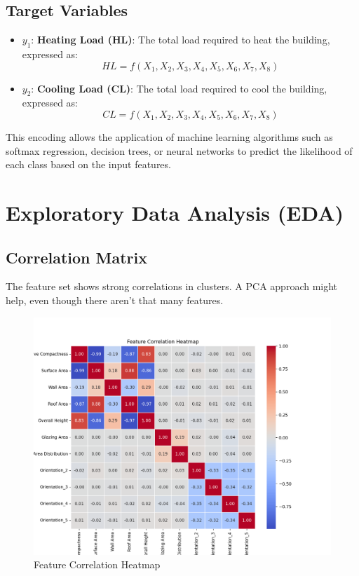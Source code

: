 \documentclass{article}
\begin{document}
\subsection{Target Variables}
\begin{itemize}
    \item \( y_1 \): \textbf{Heating Load (HL)}: The total load required to heat the building, expressed as:
    \[
    HL = f(X_1, X_2, X_3, X_4, X_5, X_6, X_7, X_8)
    \]

    \item \( y_2 \): \textbf{Cooling Load (CL)}: The total load required to cool the building, expressed as:
    \[
    CL = f(X_1, X_2, X_3, X_4, X_5, X_6, X_7, X_8)
    \]
\end{itemize}

This encoding allows the application of machine learning algorithms such as softmax regression, decision trees, or neural networks to predict the likelihood of each class based on the input features.

\section{Exploratory Data Analysis (EDA)}

\subsection{Correlation Matrix}
The feature set shows strong correlations in clusters. A PCA approach might help, even though there aren't that many features.

\begin{figure}[H]  
    \centering
    \includegraphics[width=.7\linewidth]{Feature_Correlation_Heatmap.png}
    \caption{Feature Correlation Heatmap}
    \vspace{-1em} %
\end{figure}
\end{document}
